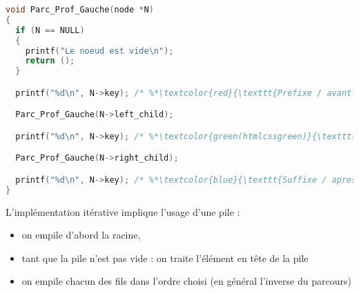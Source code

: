 \documentclass[11pt,a4paper]{article}
\begin{document}
\begin{center}
\begin{table}[ht!]
\begin{minipage}{0.30\textwidth}
\bigskip
\bigskip



  \end{minipage}
  \hfillx
  \begin{minipage}{0.15\textwidth}

\phantom{Test.}

  \end{minipage}
\end{table}
\end{center}

%
%

\begin{lstlisting}[language=C]
void Parc_Prof_Gauche(node *N)
{
  if (N == NULL)
  {
    printf("Le noeud est vide\n");
    return ();
  }

  printf("%d\n", N->key); /* %*\textcolor{red}{\texttt{Prefixe / avant fils gauche}}*) */

  Parc_Prof_Gauche(N->left_child);

  printf("%d\n", N->key); /* %*\textcolor{green(htmlcssgreen)}{\texttt{Infixe / ap. fils gauche \& av. fils droit}}*) */

  Parc_Prof_Gauche(N->right_child);

  printf("%d\n", N->key); /* %*\textcolor{blue}{\texttt{Suffixe / apres fils droit}}*) */
} \end{lstlisting}



L'implémentation itérative implique l'usage d'une pile :
\begin{itemize}
\item on empile d'abord la racine,
\item tant que la pile n'est pas vide : on traite l'élément en tête de la pile
\item on empile chacun des fils dans l'ordre choisi (en général l'inverse du parcours)
\end{itemize}
\end{document}
